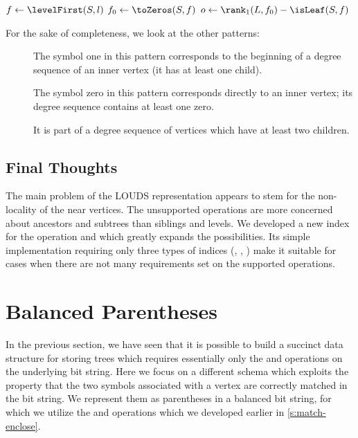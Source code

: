 \begin{algorithm}
\begin{algorithmic}
	\State $f \gets \levelFirst(S, l)$ 
	\State $f_0 \gets \toZeros(S, f)$
	\State $o \gets \rank_1(L, f_0) - \isLeaf(S, f)$ 
	\State {}
\EndFunction
\end{algorithmic}
\end{algorithm}

\bigbreak

For the sake of completeness, we look at the other patterns:
\begin{description}
	\item[]
	The symbol one in this pattern corresponds to the beginning of a degree sequence of an inner vertex (it has at least one child).
	\item[]
	The symbol zero in this pattern corresponds directly to an inner vertex; its degree sequence contains at least one zero.
	\item[]
	It is part of a degree sequence of vertices which have at least two children.
\end{description}

\subsection{Final Thoughts}

The main problem of the LOUDS representation appears to stem for the non-locality of the near vertices.
The unsupported operations are more concerned about ancestors and subtrees than siblings and levels.
We developed a new index for the operation \dep{} and \levelAny{} which greatly expands the possibilities.
Its simple implementation requiring only three types of indices (\rank{}, \select{}, \blockOfD{}) make it suitable for cases when there are not many requirements set on the supported operations.

\section{Balanced Parentheses}

In the previous section, we have seen that it is possible to build a succinct data structure for storing trees which requires essentially only the \rank{} and \select{} operations on the underlying bit string.
Here we focus on a different schema which exploits the property that the two symbols associated with a vertex are correctly matched in the bit string.
We represent them as parentheses in a balanced bit string, for which we utilize the \match{} and \enclose{} operations which we developed earlier in \ref{s:match-enclose}.

